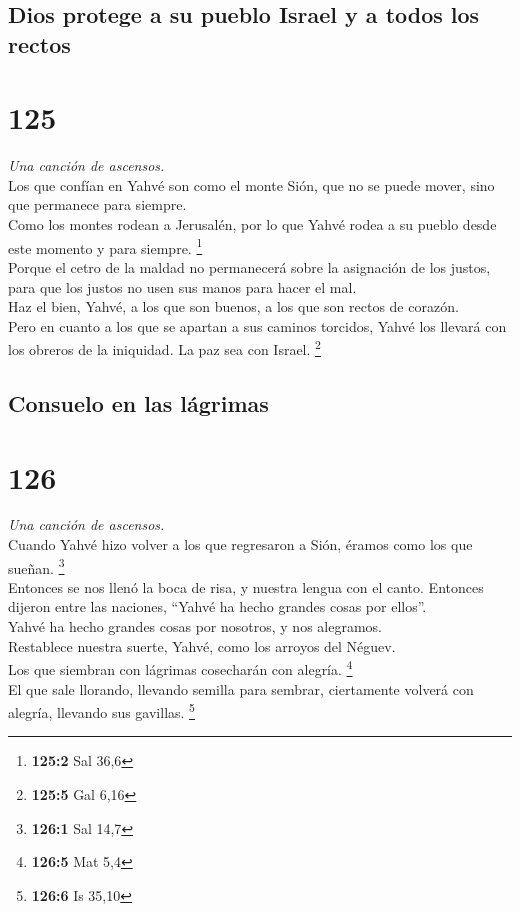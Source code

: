 \hypertarget{dios-protege-a-su-pueblo-israel-y-a-todos-los-rectos}{%
\subsection{Dios protege a su pueblo Israel y a todos los
rectos}\label{dios-protege-a-su-pueblo-israel-y-a-todos-los-rectos}}

\hypertarget{section-122}{%
\section{125}\label{section-122}}

\emph{Una canción de ascensos.}\\
 Los que confían en Yahvé son como el monte Sión, que no
se puede mover, sino que permanece para siempre.\\
 Como los montes rodean a Jerusalén, por lo que Yahvé
rodea a su pueblo desde este momento y para siempre. \footnote{\textbf{125:2}
  Sal 36,6}\\
 Porque el cetro de la maldad no permanecerá sobre la
asignación de los justos, para que los justos no usen sus manos para
hacer el mal.\\
 Haz el bien, Yahvé, a los que son buenos, a los que son
rectos de corazón.\\
 Pero en cuanto a los que se apartan a sus caminos
torcidos, Yahvé los llevará con los obreros de la iniquidad. La paz sea
con Israel. \footnote{\textbf{125:5} Gal 6,16}

\hypertarget{consuelo-en-las-luxe1grimas}{%
\subsection{Consuelo en las
lágrimas}\label{consuelo-en-las-luxe1grimas}}

\hypertarget{section-123}{%
\section{126}\label{section-123}}

\emph{Una canción de ascensos.}\\
 Cuando Yahvé hizo volver a los que regresaron a Sión,
éramos como los que sueñan. \footnote{\textbf{126:1} Sal 14,7}\\
 Entonces se nos llenó la boca de risa, y nuestra lengua
con el canto. Entonces dijeron entre las naciones, ``Yahvé ha hecho
grandes cosas por ellos''.\\
 Yahvé ha hecho grandes cosas por nosotros, y nos
alegramos.\\
 Restablece nuestra suerte, Yahvé, como los arroyos del
Néguev.\\
 Los que siembran con lágrimas cosecharán con alegría.
\footnote{\textbf{126:5} Mat 5,4}\\
 El que sale llorando, llevando semilla para sembrar,
ciertamente volverá con alegría, llevando sus gavillas. \footnote{\textbf{126:6}
  Is 35,10}

